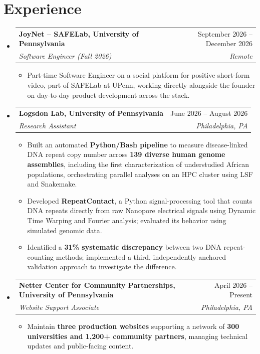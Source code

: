 \documentclass[letterpaper,10pt]{article}
\makeatletter
\newcommand{\resumeItem}[1]{\item \small{#1}}
\newcommand{\resumeSubheading}[4]{
\item \begin{tabularx}{\linewidth}{@{}X r@{}}
\textbf{#1} & \small #2 \\
\textit{\small #3} & \textit{\small #4}
\end{tabularx}\vspace{-2pt}
}
\newcommand{\resumeSubHeadingListStart}{
\begin{itemize}[
leftmargin=0pt,label={},itemsep=2pt,
topsep=2pt,parsep=0pt,partopsep=0pt
]
}
\newcommand{\resumeSubHeadingListEnd}{
\end{itemize}\vspace{2pt}
}
\newcommand{\resumeItemListStart}{
\begin{itemize}[
leftmargin=0.18in,label=\textbullet,
itemsep=1pt,topsep=1pt,parsep=0pt,partopsep=0pt
]
}
\newcommand{\resumeItemListEnd}{
\end{itemize}\vspace{1pt}
}
\makeatother
\begin{document}
\section{Experience}
\resumeSubHeadingListStart
\resumeSubheading
{JoyNet -- SAFELab, University of Pennsylvania}
{September 2026 -- December 2026}
{Software Engineer (Fall 2026)}
{Remote}
\resumeItemListStart
\resumeItem{
Part-time Software Engineer on a social platform for positive short-form video, part of SAFELab at UPenn, working directly alongside the founder on day-to-day product development across the stack.
}
\resumeItemListEnd
\resumeSubheading
{Logsdon Lab, University of Pennsylvania}
{June 2026 -- August 2026}
{Research Assistant}
{Philadelphia, PA}
\resumeItemListStart
\resumeItem{
Built an automated \textbf{Python/Bash pipeline} to measure disease-linked DNA repeat copy number across \textbf{139 diverse human genome assemblies}, including the first characterization of understudied African populations, orchestrating parallel analyses on an HPC cluster using LSF and Snakemake.
}
\resumeItem{
Developed \textbf{RepeatContact}, a Python signal-processing tool that counts DNA repeats directly from raw Nanopore electrical signals using Dynamic Time Warping and Fourier analysis; evaluated its behavior using simulated genomic data.
}
\resumeItem{
Identified a \textbf{31\% systematic discrepancy} between two DNA repeat-counting methods; implemented a third, independently anchored validation approach to investigate the difference.
}
\resumeItemListEnd
\resumeSubheading
{Netter Center for Community Partnerships, University of Pennsylvania}
{April 2026 -- Present}
{Website Support Associate}
{Philadelphia, PA}
\resumeItemListStart
\resumeItem{
Maintain \textbf{three production websites} supporting a network of \textbf{300 universities and 1,200+ community partners}, managing technical updates and public-facing content.
}
\resumeItemListEnd
\resumeSubHeadingListEnd
\end{document}
